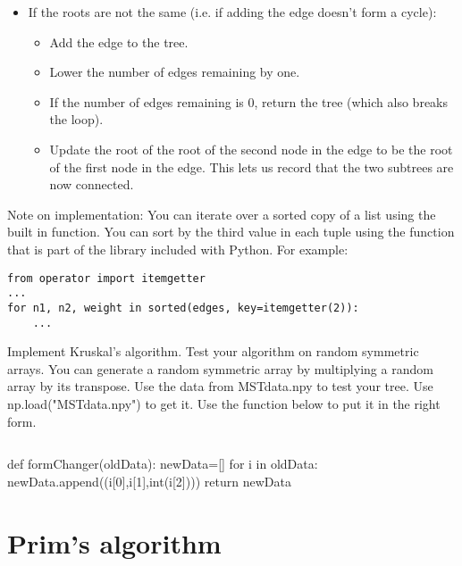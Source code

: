 \begin{itemize}
\begin{itemize}
	\item If the roots are not the same (i.e. if adding the edge doesn't form a cycle):

		\begin{itemize}

		\item Add the edge to the tree.

		\item Lower the number of edges remaining by one.

		\item If the number of edges remaining is 0, return the tree (which also breaks the loop).

		\item Update the root of the root of the second node in the edge to be the root of the first node in the edge.
			This lets us record that the two subtrees are now connected.

		\end{itemize}

	\end{itemize}

\end{itemize}
Note on implementation: You can iterate over a sorted copy of a list using the built in  function.
You can sort by the third value in each tuple using the  function that is part of the  library included with Python.
For example:
\begin{lstlisting}
from operator import itemgetter
...
for n1, n2, weight in sorted(edges, key=itemgetter(2)):
    ...
\end{lstlisting}

\begin{problem}
Implement Kruskal's algorithm.
Test your algorithm on random symmetric arrays.
You can generate a random symmetric array by multiplying a random array by its transpose.
Use the data from MSTdata.npy to test your tree.
Use np.load("MSTdata.npy") to get it.
Use the  function below to put it in the right form.
\begin{lstlisting}
\end{lstlisting}
def formChanger(oldData):
    newData=[] for i in oldData: newData.append((i[0],i[1],int(i[2])))
    return newData
\end{problem}
\section*{Prim's algorithm}

